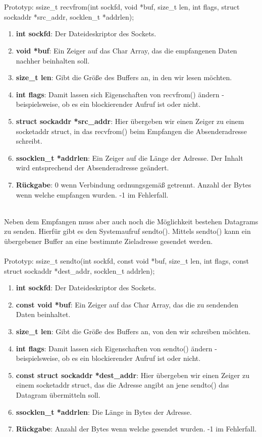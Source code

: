 \\\\
Prototyp: ssize\_t recvfrom(int sockfd, void *buf, size\_t len, int flags, struct sockaddr *src\_addr, socklen\_t *addrlen);
\begin{enumerate}
    \item \textbf{int sockfd}: Der Dateideskriptor des Sockets.
    \item \textbf{void *buf}: Ein Zeiger auf das Char Array, das die empfangenen Daten nachher beinhalten soll. 
    \item \textbf{size\_t len}: Gibt die Größe des Buffers an, in den wir lesen möchten.
    \item \textbf{int flags}: Damit lassen sich Eigenschaften von recvfrom() ändern - beispielsweise, ob es ein blockierender Aufruf ist oder nicht.
    \item \textbf{struct sockaddr *src\_addr}: Hier übergeben wir einen Zeiger zu einem socketaddr struct, in das recvfrom() beim Empfangen die Absenderadresse schreibt.
    \item \textbf{ssocklen\_t *addrlen}: Ein Zeiger auf die Länge der Adresse. Der Inhalt wird entsprechend der Absenderadresse geändert.
    \item \textbf{Rückgabe}: 0 wenn Verbindung ordnungsgemäß getrennt. Anzahl der Bytes wenn welche empfangen wurden. -1 im Fehlerfall.
\end{enumerate} 
\ \\%
Neben dem Empfangen muss aber auch noch die Möglichkeit bestehen Datagrams zu senden. Hierfür gibt es den Systemaufruf sendto(). Mittels sendto() kann ein übergebener Buffer an eine bestimmte Zieladresse gesendet werden.
\\\\
Prototyp: ssize\_t sendto(int sockfd, const void *buf, size\_t len, int flags, const struct sockaddr *dest\_addr, socklen\_t addrlen);
\begin{enumerate}
    \item \textbf{int sockfd}: Der Dateideskriptor des Sockets.
    \item \textbf{const void *buf}: Ein Zeiger auf das Char Array, das die zu sendenden Daten beinhaltet. 
    \item \textbf{size\_t len}: Gibt die Größe des Buffers an, von den wir schreiben möchten.
    \item \textbf{int flags}: Damit lassen sich Eigenschaften von sendto() ändern - beispielsweise, ob es ein blockierender Aufruf ist oder nicht.
    \item \textbf{const struct sockaddr *dest\_addr}: Hier übergeben wir einen Zeiger zu einem socketaddr struct, das die Adresse angibt an jene sendto() das Datagram übermitteln soll.
    \item \textbf{ssocklen\_t *addrlen}: Die Länge in Bytes der Adresse.
    \item \textbf{Rückgabe}: Anzahl der Bytes wenn welche gesendet wurden. -1 im Fehlerfall.
\end{enumerate} 
\ \\%
\newpage
